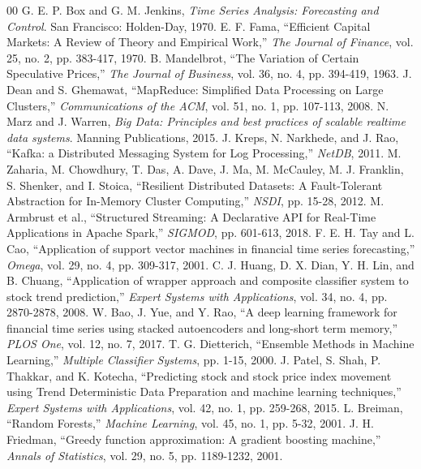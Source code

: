 \documentclass[conference]{IEEEtran}
\begin{document}
\begin{thebibliography}{00}
 G. E. P. Box and G. M. Jenkins, \textit{Time Series Analysis: Forecasting and Control}. San Francisco: Holden-Day, 1970.
 E. F. Fama, ``Efficient Capital Markets: A Review of Theory and Empirical Work,'' \textit{The Journal of Finance}, vol. 25, no. 2, pp. 383-417, 1970.
 B. Mandelbrot, ``The Variation of Certain Speculative Prices,'' \textit{The Journal of Business}, vol. 36, no. 4, pp. 394-419, 1963.
 J. Dean and S. Ghemawat, ``MapReduce: Simplified Data Processing on Large Clusters,'' \textit{Communications of the ACM}, vol. 51, no. 1, pp. 107-113, 2008.
 N. Marz and J. Warren, \textit{Big Data: Principles and best practices of scalable realtime data systems}. Manning Publications, 2015.
 J. Kreps, N. Narkhede, and J. Rao, ``Kafka: a Distributed Messaging System for Log Processing,'' \textit{NetDB}, 2011.
 M. Zaharia, M. Chowdhury, T. Das, A. Dave, J. Ma, M. McCauley, M. J. Franklin, S. Shenker, and I. Stoica, ``Resilient Distributed Datasets: A Fault-Tolerant Abstraction for In-Memory Cluster Computing,'' \textit{NSDI}, pp. 15-28, 2012.
 M. Armbrust et al., ``Structured Streaming: A Declarative API for Real-Time Applications in Apache Spark,'' \textit{SIGMOD}, pp. 601-613, 2018.
 F. E. H. Tay and L. Cao, ``Application of support vector machines in financial time series forecasting,'' \textit{Omega}, vol. 29, no. 4, pp. 309-317, 2001.
 C. J. Huang, D. X. Dian, Y. H. Lin, and B. Chuang, ``Application of wrapper approach and composite classifier system to stock trend prediction,'' \textit{Expert Systems with Applications}, vol. 34, no. 4, pp. 2870-2878, 2008.
 W. Bao, J. Yue, and Y. Rao, ``A deep learning framework for financial time series using stacked autoencoders and long-short term memory,'' \textit{PLOS One}, vol. 12, no. 7, 2017.
 T. G. Dietterich, ``Ensemble Methods in Machine Learning,'' \textit{Multiple Classifier Systems}, pp. 1-15, 2000.
 J. Patel, S. Shah, P. Thakkar, and K. Kotecha, ``Predicting stock and stock price index movement using Trend Deterministic Data Preparation and machine learning techniques,'' \textit{Expert Systems with Applications}, vol. 42, no. 1, pp. 259-268, 2015.
 L. Breiman, ``Random Forests,'' \textit{Machine Learning}, vol. 45, no. 1, pp. 5-32, 2001.
 J. H. Friedman, ``Greedy function approximation: A gradient boosting machine,'' \textit{Annals of Statistics}, vol. 29, no. 5, pp. 1189-1232, 2001.

\end{thebibliography}
\end{document}
